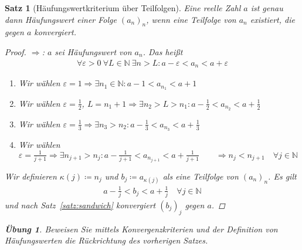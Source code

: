 \documentclass[11pt, twoside, a4paper]{article}
\theoremstyle{plain}
\newtheorem{satz}[blockelement]{Satz}
\newtheorem{uebung}[blockelement]{Übung}
\newcommand{\pair}[1]{\left(#1\right)}
\newcommand{\impl}[0]{\Rightarrow{}}
\newcommand{\definedas}[0]{\coloneqq}
\newcommand{\anf}[1]{\glqq{}#1\grqq}
\newcommand{\naturalnumbers}{\mathbb{N}}
\begin{document}
    \begin{satz}[Häufungswertkriterium über Teilfolgen]
        \label{satz:haeufungswert-teilfolge}
        Eine reelle Zahl $a$ ist genau dann Häufungswert einer Folge $(a_n)_n$, wenn eine Teilfolge von $a_n$ existiert, die gegen $a$ konvergiert.

        \begin{proof}
            \anf{$\impl$}: $a$ sei Häufungswert von $a_n$. Das heißt
            \begin{align*}
                \forall \varepsilon > 0~\forall L\in\naturalnumbers~\exists n>L\colon a-\varepsilon < a_n < a+\varepsilon
            \end{align*}
            \begin{enumerate}[label=\arabic*)]
                \item Wir wählen $\varepsilon = 1 \impl \exists n_1\in\naturalnumbers\colon a-1 < a_{n_1} < a+1$
                \item Wir wählen $\varepsilon = \frac{1}{2}$, $L=n_1 + 1 \impl \exists n_2 > L > n_1\colon a-\frac{1}{2} < a_{n_2} < a + \frac{1}{2}$
                \item Wir wählen $\varepsilon = \frac{1}{3} \impl \exists n_3 > n_2\colon a - \frac{1}{3} < a_{n_3} < a + \frac{1}{3}$
                \item[$j$)] Wir wählen $\varepsilon = \frac{1}{j+1} \impl \exists n_{j+1} > n_j\colon a-\frac{1}{j+1} < a_{n_{j+1}} < a + \frac{1}{j+1}\qquad \impl n_j < n_{j+1}\quad\forall j \in \naturalnumbers$
            \end{enumerate}
            \noindent Wir definieren $\kappa\pair{j} \definedas n_j$ und $b_j \definedas a_{\kappa(j)}$ als eine Teilfolge von $(a_n)_n$. Es gilt
            \begin{align*}
                a-\frac{1}{j} < b_j < a + \frac{1}{j}\quad\forall j\in\naturalnumbers
            \end{align*}
            und nach Satz~\ref{satz:sandwich} konvergiert $(b_j)_j$ gegen $a$.\qedhere
        \end{proof}
        \begin{uebung}
            Beweisen Sie mittels Konvergenzkriterien und der Definition von Häufungswerten die Rückrichtung des vorherigen Satzes.
        \end{uebung}
    \end{satz}

    \newpage

\end{document}
